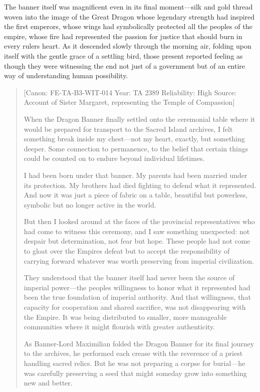 The banner itself was magnificent even in its final moment---silk and
gold thread woven into the image of the Great Dragon whose legendary
strength had inspired the first emperors, whose wings had symbolically
protected all the peoples of the empire, whose fire had represented the
passion for justice that should burn in every ruler\textquotesingle s
heart. As it descended slowly through the morning air, folding upon
itself with the gentle grace of a settling bird, those present reported
feeling as though they were witnessing the end not just of a government
but of an entire way of understanding human possibility.

\begin{quote}
{[}Canon: FE-TA-B3-WIT-014 \textbar{} Year: TA 2389 \textbar{}
Reliability: High \textbar{} Source: Account of Sister Margaret,
representing the Temple of Compassion{]}

When the Dragon Banner finally settled onto the ceremonial table where
it would be prepared for transport to the Sacred Island archives, I felt
something break inside my chest---not my heart, exactly, but something
deeper. Some connection to permanence, to the belief that certain things
could be counted on to endure beyond individual lifetimes.

I had been born under that banner. My parents had been married under its
protection. My brothers had died fighting to defend what it represented.
And now it was just a piece of fabric on a table, beautiful but
powerless, symbolic but no longer active in the world.

But then I looked around at the faces of the provincial representatives
who had come to witness this ceremony, and I saw something unexpected:
not despair but determination, not fear but hope. These people had not
come to gloat over the Empire\textquotesingle s defeat but to accept the
responsibility of carrying forward whatever was worth preserving from
imperial civilization.

They understood that the banner itself had never been the source of
imperial power---the people\textquotesingle s willingness to honor what
it represented had been the true foundation of imperial authority. And
that willingness, that capacity for cooperation and shared sacrifice,
was not disappearing with the Empire. It was being distributed to
smaller, more manageable communities where it might flourish with
greater authenticity.

As Banner-Lord Maximilian folded the Dragon Banner for its final journey
to the archives, he performed each crease with the reverence of a priest
handling sacred relics. But he was not preparing a corpse for
burial---he was carefully preserving a seed that might someday grow into
something new and better.


\end{quote}
